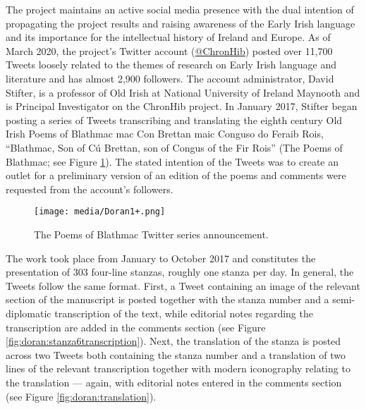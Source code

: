 \begin{paper}
The project maintains an active social media presence with the dual intention of propagating the project results and raising awareness of the Early Irish language and its importance for the intellectual history of Ireland and Europe. As of March 2020, the project’s Twitter account (\href{https://twitter.com/chronhib}{@ChronHib}) posted over 11,700 Tweets loosely related to the themes of research on Early Irish language and literature and has almost 2,900 followers. The account administrator, David Stifter, is a professor of Old Irish at National University of Ireland Maynooth and is Principal Investigator on the ChronHib project. In January 2017, Stifter began posting a series of Tweets transcribing and translating the eighth century Old Irish Poems of Blathmac mac Con Brettan maic Conguso do Feraib Rois, ``Blathmac, Son of Cú Brettan, son of Congus of the Fir Rois'' (The Poems of Blathmac; see Figure \ref{fig:doran:announcement}).  The stated intention of the Tweets was to create an outlet for a preliminary version of an edition of the poems and comments were requested from the account’s followers.

\renewcommand*{\thefootnote}{\fnsymbol{footnote}} 
\begin{figure}[h]
    \centering
    \texttt{[image: media/Doran1+.png]}
    \caption[The Poems of Blathmac Twitter series announcement.]{The Poems of Blathmac Twitter series announcement.\footnotemark[1]}
    \label{fig:doran:announcement}
\end{figure}


\noindent The work took place from January to October 2017 and constitutes the presentation of 303 four-line stanzas, roughly one stanza per day. In general, the Tweets follow the same format. First, a Tweet containing an image of the relevant section of the manuscript is posted together with the stanza number and a semi-diplomatic transcription of the text, while editorial notes regarding the transcription are added in the comments section (see Figure \ref{fig:doran:stanza6transcription}). Next, the translation of the stanza is posted across two Tweets both containing the stanza number and a translation of two lines of the relevant transcription together with modern iconography relating to the translation --- again, with editorial notes  entered in the comments section (see Figure \ref{fig:doran:translation}).


\end{paper}
